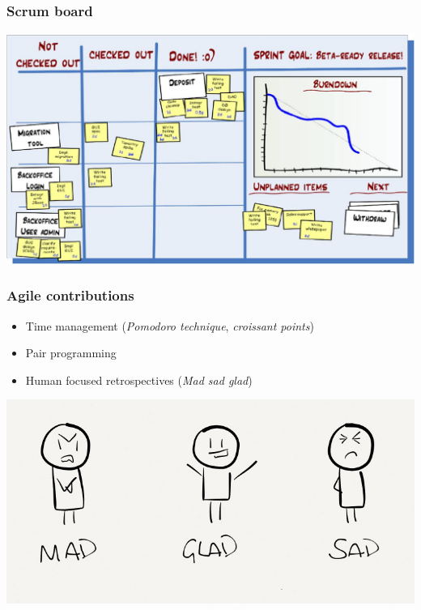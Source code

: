 \begin{FrameWithSubSection}
    \frametitle{Scrum board}
    \includegraphics[width=\textwidth]{../../report/src/img/taskboard.jpg}
\end{FrameWithSubSection}

\begin{FrameWithSubSection}
    \frametitle{Agile contributions}
    \begin{minipage}{0.49\textwidth}
        \begin{itemize}
            \item Time management (\emph{Pomodoro technique}, \emph{croissant points})
            \item Pair programming
            \item Human focused retrospectives (\emph{Mad sad glad})
        \end{itemize}
    \end{minipage}
    \begin{minipage}{0.49\textwidth}
        \flushright
        \includegraphics[width=\textwidth]{../../report/src/img/mgs.png}
    \end{minipage}
\end{FrameWithSubSection}
